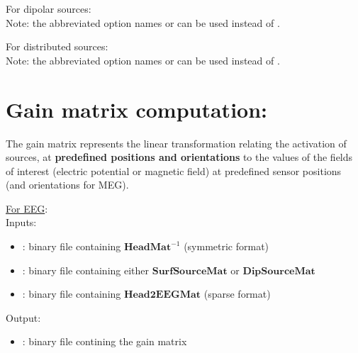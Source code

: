 \medskip

\noindent
For dipolar sources:\\
\noindent
{}
\medskip
Note:  the abbreviated option names  or  can be used instead of .

\medskip

\noindent
For distributed sources:\\
\noindent
{}
\medskip
Note:   the abbreviated option names   or  can be used instead of .

\section{Gain matrix computation:}
\label{sect: command gain}

The gain matrix represents the linear transformation relating the activation of sources, at \textbf{predefined positions and orientations} to the values of the fields of interest (electric potential or magnetic field) at predefined sensor positions (and orientations for MEG). 

\checkItem \underline{For EEG}:\\
Inputs:
\begin{itemize}
    \item {}: binary file containing $\mathbf{HeadMat}^{-1}$ (symmetric format)
    \item {}: binary file containing either  $\mathbf{SurfSourceMat}$ or  $\mathbf{DipSourceMat}$
    \item {}: binary file containing $\mathbf{Head2EEGMat}$ (sparse format)
\end{itemize}
Output:
\begin{itemize}
    \item {}: binary file contining the gain matrix
\end{itemize}

\medskip

\noindent
{}


